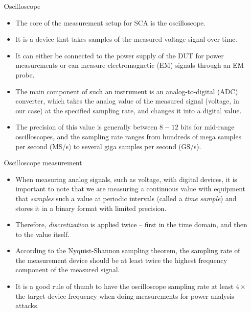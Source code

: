 \begin{frame}{Oscilloscope}
    \begin{itemize}
        \item The core of the measurement setup for SCA is the oscilloscope. 
        \item It is a device that takes samples of the measured voltage signal over time.
        \item It can either be connected to the power supply of the DUT for power measurements or can measure electromagnetic (EM) signals through an EM probe.
        \item The main component of such an instrument is an analog-to-digital (ADC) converter, which takes the analog value of the measured signal (voltage, in our case) at the specified sampling rate, and changes it into a digital value.
        \item The precision of this value is generally between $8 - 12$ bits for mid-range oscilloscopes, and the sampling rate ranges from hundreds of mega samples per second (MS/s) to several giga samples per second (GS/s).
    \end{itemize}
\end{frame}

\begin{frame}{Oscilloscope measurement}
    \begin{itemize}
        \item When measuring analog signals, such as voltage, with digital devices, it is important to note that we are measuring a continuous value with equipment that \textit{samples} such a value at periodic intervals (called a \textit{time sample}) and stores it in a binary format with limited precision.
        \item Therefore, \textit{discretization} is applied twice -- first in the time domain, and then to the value itself.
        \item According to the Nyquist-Shannon sampling theorem, the sampling rate of the measurement device should be at least twice the highest frequency component of the measured signal.
        \item It is a good rule of thumb to have the oscilloscope sampling rate at least $4\times$ the target device frequency when doing measurements for power analysis attacks.
    \end{itemize}
\end{frame}

